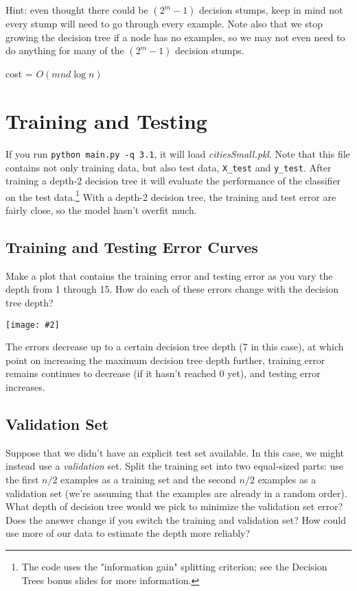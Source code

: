 \documentclass{article}
\def\blu#1{{\color{blu}#1}}
\newcommand{\fig}[2]{\texttt{[image: \#2]}}
\begin{document}
Hint: even thought there could be $(2^m-1)$ decision stumps, keep in mind not every stump will need to go through every example. Note also that we stop growing the decision tree if a node has no examples, so we may not even need to do anything for many of the $(2^m-1)$ decision stumps.

cost = $O(mnd\log n)$

\section{Training and Testing}
If you run \texttt{python main.py \string-q 3.1}, it will load \emph{citiesSmall.pkl}.
Note that this file contains not only training data, but also test data, \texttt{X\string_test} and \texttt{y\string_test}.
After training a depth-2 decision tree it will evaluate the performance of the classifier on the test data.\footnote{The code uses the "information gain" splitting criterion; see the Decision Trees bonus slides for more information.} With a depth-2 decision tree, the training and test error are fairly close, so the model hasn't overfit much.

\subsection{Training and Testing Error Curves}

\blu{Make a plot that contains the training error and testing error as you vary the depth from 1 through 15. How do each of these errors change with the decision tree depth?}
\begin{center}
\fig{0.7}{../figs/q31_TestingErrVsTrainingErr}
\end{center}
The errors decrease up to a certain decision tree depth (7 in this case), at which point on increasing the maximum decision tree depth further, training error remains continues to decrease (if it hasn’t reached 0 yet), and testing error increases.

\subsection{Validation Set}

Suppose that we didn't have an explicit test set available. In this case, we might instead use a \emph{validation} set. Split the training set into two equal-sized parts: use the first $n/2$ examples as a training set and the second $n/2$ examples as a validation set (we're assuming that the examples are already in a random order). \blu{What depth of decision tree would we pick to minimize the validation set error? Does the answer change if you switch the training and validation set? How could use more of our data to  estimate the depth more reliably?}
\end{document}
